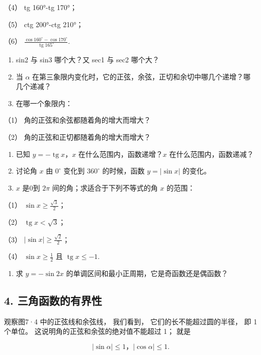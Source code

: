 （4） tg 160°-tg 170°；

（5） ctg 200°-ctg 210°；

（6）
\(\frac{\cos 160^{\circ} - \cos 170^{\circ}}{\operatorname{tg} 165^{\circ}}.\)

\begin{enumerate}[start=2]
\item
  sin2 与 sin3 哪个大？又 sec1 与 sec2 哪个大？
\item
  当 \(\alpha\)
  在第三象限内变化时，它的正弦，余弦，正切和余切中哪几个递增？哪几个递减？
\item
  在哪一个象限内：
\end{enumerate}

（1） 角的正弦和余弦都随着角的增大而增大？

（2） 角的正弦和正切都随着角的增大而增大？

\begin{enumerate}[start=5]
\item
  已知 \(y = -\operatorname{tg} x\)，\(x\) 在什么范围内，函数递增？\(x\)
  在什么范围内，函数递减？
\item
  讨论角 \(x\) 由 \(0^{\circ}\) 变化到 \(360^{\circ}\) 的时候，函数
  \(y = |\sin x|\) 的变化。
\item
  \(x\) 是0到 \(2\pi\) 间的角；求适合于下列不等式的角 \(x\) 的范围：
\end{enumerate}

（1） \(\sin x \geqslant \frac{\sqrt{3}}{2}\)；

（2） \(\operatorname{tg} x < \sqrt{3}\)；

（3） \(|\sin x| \geqslant \frac{\sqrt{2}}{2}\)；

（4） \(\sin x \geqslant \frac{1}{2}\) 且
\(\operatorname{tg} x \leqslant -1\).

\begin{enumerate}[start=8]
\item
  求 \(y = -\sin 2x\) 的单调区间和最小正周期，它是奇函数还是偶函数？
\end{enumerate}

\subsection{4. 三角函数的有界性}

观察图7·4 中的正弦线和余弦线， 我们看到， 它们的长不能超过圆的半径， 即
1 个单位。 这说明角的正弦和余弦的绝对值不能超过 1； 就是

\[
\left| \sin \alpha \right| \leqslant 1\text{，} \left| \cos \alpha \right| \leqslant 1.
\]

